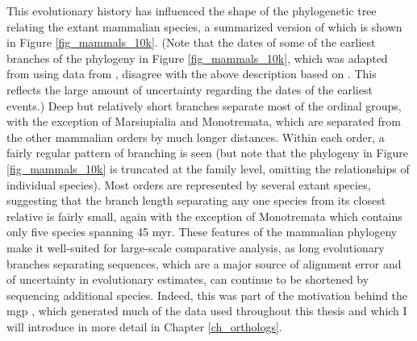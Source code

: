 This evolutionary history has influenced the shape of the phylogenetic
tree relating the extant mammalian species, a summarized version of
which is shown in Figure \ref{fig_mammals_10k}. (Note that the dates
of some of the earliest branches of the phylogeny in Figure
\ref{fig_mammals_10k}, which was adapted from \citet{Haussler2009}
using data from \citet{Hedges2009}, disagree with the above
description based on \citet{BinindaEmonds2007}. This reflects the
large amount of uncertainty regarding the dates of the earliest
events.) Deep but relatively short branches separate most of the
ordinal groups, with the exception of Marsiupialia and Monotremata,
which are separated from the other mammalian orders by much longer
distances. Within each order, a fairly regular pattern of branching is
seen (but note that the phylogeny in Figure \ref{fig_mammals_10k} is
truncated at the family level, omitting the relationships of
individual species). Most orders are represented by several extant
species, suggesting that the branch length separating any one species
from its closest relative is fairly small, again with the exception of
Monotremata which contains only five species spanning 45
\ac{myr}. These features of the mammalian phylogeny make it
well-suited for large-scale comparative analysis, as long evolutionary
branches separating sequences, which are a major source of alignment
error and of uncertainty in evolutionary estimates, can continue to be
shortened by sequencing additional species. Indeed, this was part of
the motivation behind the \ac{mgp} \citep{LindbladToh2011}, which
generated much of the data used throughout this thesis and which I
will introduce in more detail in Chapter \ref{ch_orthologs}.

